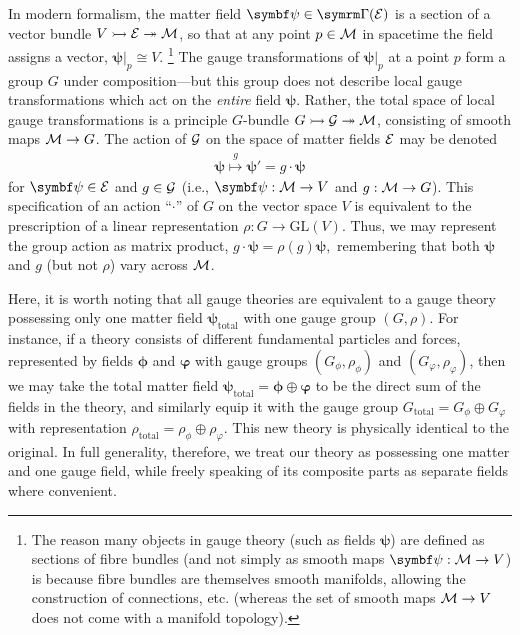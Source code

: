 In modern formalism, the matter field $\bm\psi \in \secs(\cal E)$ is a section of a vector bundle $\fibrebundle{V}{\cal E}{\cal M}$, so that at any point $p \in \cal M$ in spacetime the field assigns a vector, $\bm\psi|_p \cong V$.%
\footnote{
	The reason many objects in gauge theory (such as fields $\bm\psi$) are defined as sections of fibre bundles (and not simply as smooth maps $\bm\psi : \cal M \to V$) is because fibre bundles are themselves smooth manifolds, allowing the construction of connections, etc. (whereas the set of smooth maps $\cal M \to V$ does not come with a manifold topology).
}
The gauge transformations of $\bm\psi|_p$ at a point $p$ form a group $G$ under composition---but this group does not describe local gauge transformations which act on the \emph{entire} field $\bm\psi$.
Rather, the total space of local gauge transformations is a principle $G$-bundle $\fibrebundle{G}{\cal G}{\cal M}$, consisting of smooth maps $\cal M \to G$.
The action of $\cal G$ on the space of matter fields $\cal E$ may be denoted
\begin{align}
	\bm\psi \overset{g}{\mapsto} \bm\psi' = g\cdot\bm\psi
\end{align}
for $\bm\psi \in \cal E$ and $g \in \cal G$ (i.e., $\bm\psi : \cal M \to V$ and $g : \cal M \to G$).
This specification of an action ``$\cdot$'' of $G$ on the vector space $V$ is equivalent to the prescription of a linear representation $\rho : G \to \mathrm{GL}(V)$.
Thus, we may represent the group action as matrix product,
\begin{math}
	g \cdot \bm\psi = \rho(g)\bm\psi
,\end{math}
remembering that both $\bm\psi$ and $g$ (but not $\rho$) vary across $\cal M$.

Here, it is worth noting that all gauge theories are equivalent to a gauge theory possessing only one matter field $\bm\psi_\text{total}$ with one gauge group $(G, \rho)$.
For instance, if a theory consists of different fundamental particles and forces, represented by fields $\bm\phi$ and $\bm\varphi$ with gauge groups $(G_\phi, \rho_\phi)$ and $(G_\varphi, \rho_\varphi)$,
then we may take the total matter field $\bm\psi_\text{total} = \bm\phi \oplus \bm\varphi$ to be the direct sum of the fields in the theory, and similarly equip it with the gauge group $G_\text{total} = G_\phi \oplus G_\varphi$ with representation $\rho_\text{total} = \rho_\phi \oplus \rho_\varphi$.
This new theory is physically identical to the original.
In full generality, therefore, we treat our theory as possessing one matter and one gauge field, while freely speaking of its composite parts as separate fields where convenient.

